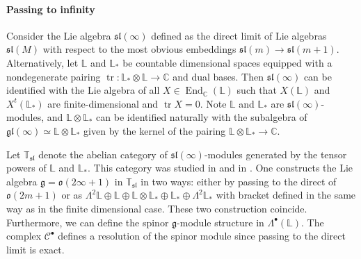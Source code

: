 \documentclass[12pt, reqno]{article}
\def\gen{\mathfrak{g}}
\def\len{\mathfrak{l}}
\def\Cc{\mathcal{C}}
\def\fsl{\mathfrak{sl}}
\def\End{\on{{End}}}
\def\gl{{\gen\len}}
\def\o{{\mathfrak{o}}}
\def\on{\operatorname}
\def\tr{{\on{tr}}}
\theoremstyle{definition}
\theoremstyle{remark}
\numberwithin{itemcounter}{section}
\numberwithin{equation}{section}
\begin{document}
   
      
 
    
    
    
    
   \iffalse
 \paragraph{Passing to infinity} Consider the Lie algebra $\mathfrak{sl}(\infty)$ defined as the direct limit of Lie algebras $\mathfrak{sl}(M)$ with respect to the most obvious embeddings $\mathfrak{sl}(m)\to\mathfrak{sl}(m+1) $.
 Alternatively, 
 let $\mathbb L$ and $\mathbb L_*$ be  countable dimensional spaces equipped with a nondegenerate pairing $\tr:\mathbb L_*\otimes \mathbb L\to\mathbb C$    and dual bases. Then $\mathfrak{sl}(\infty)$ can be identified with the Lie algebra of all
 $X\in \End_{\mathbb C}(\mathbb L)$ such that $ X(\mathbb L)$ and $X^t (\mathbb L_*)$ are finite-dimensional and $\tr X=0$. Note $\mathbb L$ and $\mathbb L_*$ are  $\mathfrak{sl}(\infty)$-modules, and $\mathbb L\otimes \mathbb L_*$ can be identified naturally with the subalgebra of $\gl(\infty)\simeq \mathbb L\otimes \mathbb L_*$ given by the kernel of the pairing $\mathbb L\otimes \mathbb L_*\to\mathbb C$.

 Let $\mathbb T_\fsl$ denote the abelian category of $\fsl(\infty)$-modules generated by the tensor powers of $\mathbb L$ and $\mathbb L_*$. This category was studied in \cite{DPS} and in \cite{SS-stable}. One constructs the Lie algebra  $\gen=\o(2\infty+1)$ in $\mathbb T_\fsl$ in two ways: either by passing to the direct of  $\o(2m+1)$ or as $\Lambda^2\mathbb L\oplus \mathbb L\oplus \mathbb L\otimes \mathbb L_*\oplus \mathbb L_*\oplus\Lambda^2 \mathbb L_*$ with  bracket defined in the same way as in the finite dimensional case. These two construction coincide. Furthermore, we can define the spinor $\gen$-module structure in $\Lambda^\bullet(\mathbb L)$. The complex $ \Cc^{\bullet}$ defines a resolution of the spinor module since passing to the direct limit is exact.
\end{document}
